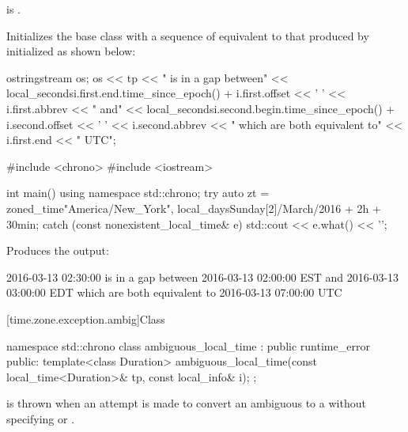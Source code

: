\begin{itemdescr}
\pnum
\expects
{} is .

\pnum
\effects
Initializes the base class with a sequence of 
equivalent to that produced by 
initialized as shown below:

\begin{codeblock}
ostringstream os;
os << tp << " is in a gap between\n"
   << local_seconds{i.first.end.time_since_epoch()} + i.first.offset << ' '
   << i.first.abbrev << " and\n"
   << local_seconds{i.second.begin.time_since_epoch()} + i.second.offset << ' '
   << i.second.abbrev
   << " which are both equivalent to\n"
   << i.first.end << " UTC";
\end{codeblock}

\pnum
\begin{example}
\begin{codeblock}
#include <chrono>
#include <iostream>

int main() {
  using namespace std::chrono;
  try {
    auto zt = zoned_time{"America/New_York",
                         local_days{Sunday[2]/March/2016} + 2h + 30min};
  } catch (const nonexistent_local_time& e) {
    std::cout << e.what() << '\n';
  }
}
\end{codeblock}

Produces the output:

\begin{outputblock}
2016-03-13 02:30:00 is in a gap between
2016-03-13 02:00:00 EST and
2016-03-13 03:00:00 EDT which are both equivalent to
2016-03-13 07:00:00 UTC
\end{outputblock}
\end{example}
\end{itemdescr}

[time.zone.exception.ambig]{Class }

\begin{codeblock}
namespace std::chrono {
  class ambiguous_local_time : public runtime_error {
  public:
    template<class Duration>
      ambiguous_local_time(const local_time<Duration>& tp, const local_info& i);
  };
}
\end{codeblock}

\pnum
{} is thrown when
an attempt is made
to convert an ambiguous  to a 
without specifying  or .

